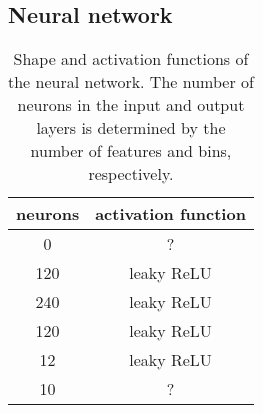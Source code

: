\subsection{Neural network}

\begin{table}
  \centering
  \caption{
    Shape and activation functions of the neural network.
    The number of neurons in the input and output layers is determined by the number of features and bins, respectively.
  }
  \label{tab:nn_shape}
  \begin{tabular}{S[table-format=4.0] c}
    \toprule
    {neurons} & {activation function} \\
       & ? \\ %
    120 & leaky ReLU \\
    240 & leaky ReLU \\
    120 & leaky ReLU \\
    12  & leaky ReLU \\
    10  & ? \\
    \bottomrule
  \end{tabular}
\end{table}

